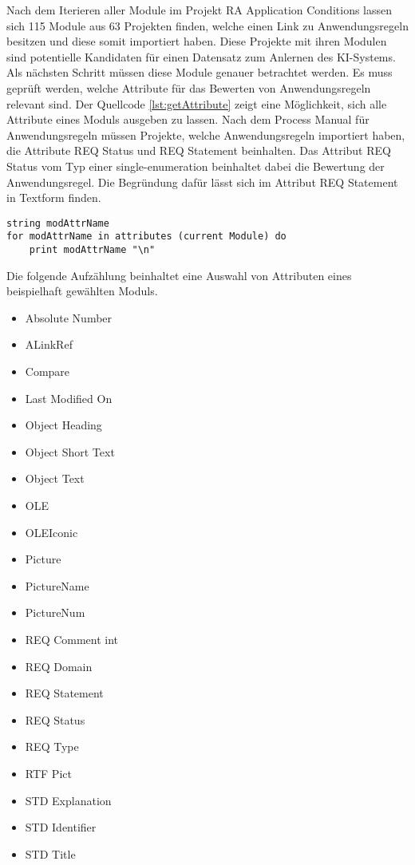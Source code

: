 Nach dem Iterieren aller Module im Projekt RA Application Conditions lassen sich 115 Module aus 63 Projekten finden, welche einen Link zu Anwendungsregeln besitzen und diese somit importiert haben.
Diese Projekte mit ihren Modulen sind potentielle Kandidaten für einen Datensatz zum Anlernen des KI-Systems. Als nächsten Schritt müssen diese Module genauer betrachtet werden. Es muss geprüft werden,
welche Attribute für das Bewerten von Anwendungsregeln relevant sind. Der Quellcode \ref*{lst:getAttribute} zeigt eine Möglichkeit, sich alle Attribute eines Moduls ausgeben zu lassen. 
Nach dem Process Manual für Anwendungsregeln müssen Projekte, welche Anwendungsregeln importiert haben, die Attribute REQ Status und REQ Statement beinhalten. Das Attribut REQ Status vom Typ einer
single-enumeration beinhaltet dabei die Bewertung der Anwendungsregel. Die Begründung dafür lässt sich im Attribut REQ Statement in Textform finden\cite[S.14]{q2}. 


\begin{lstlisting}[caption={Alle Attribute eines Moduls ausgeben \cite{q9}}, captionpos=b, label = lst:getAttribute] 
string modAttrName
for modAttrName in attributes (current Module) do
    print modAttrName "\n"
\end{lstlisting}

Die folgende Aufzählung beinhaltet eine Auswahl von Attributen eines beispielhaft gewählten Moduls. 

\begin{multicols}{3}
    \begin{itemize}
        \setlength{\itemsep}{0cm}
        \item Absolute Number
        \item ALinkRef
        \item Compare
        \item Last Modified On
        \item Object Heading
        \item Object Short Text
        \item Object Text
        \item OLE
        \item OLEIconic
        \item Picture
        \item PictureName
        \item PictureNum
        \item REQ Comment int
        \item REQ Domain
        \item REQ Statement
        \item REQ Status
        \item REQ Type
        \item RTF Pict
        \item STD Explanation
        \item STD Identifier
        \item STD Title
    \end{itemize}
\end{multicols}

